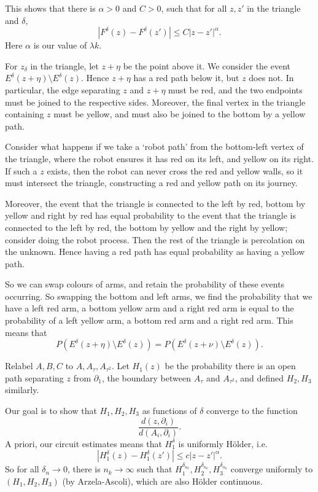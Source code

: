 \documentclass[12pt]{article}
\begin{document}
This shows that there is $\alpha  > 0$ and $C > 0$, such that for all $z, z'$ in the triangle and $\delta$,
\[
|F^{\delta}(z) - F^{\delta}(z')| \leq C |z - z'|^{\alpha}.
\]
Here $\alpha$ is our value of $\lambda k$.

For $z_\delta$ in the triangle, let $z + \eta$ be the point above it. We consider the event $E^{\delta}(z + \eta) \setminus E^{\delta}(z)$. Hence $z + \eta$ has a red path below it, but $z$ does not. In particular, the edge separating $z$ and $z + \eta$ must be red, and the two endpoints must be joined to the respective sides. Moreover, the final vertex in the triangle containing $z$ must be yellow, and must also be joined to the bottom by a yellow path.

Consider what happens if we take a `robot path' from the bottom-left vertex of the triangle, where the robot ensures it has red on its left, and yellow on its right. If such a $z$ exists, then the robot can never cross the red and yellow walls, so it must intersect the triangle, constructing a red and yellow path on its journey.

Moreover, the event that the triangle is connected to the left by red, bottom by yellow and right by red has equal probability to the event that the triangle is connected to the left by red, the bottom by yellow and the right by yellow; consider doing the robot process. Then the rest of the triangle is percolation on the unknown. Hence having a red path has equal probability as having a yellow path.

So we can swap colours of arms, and retain the probability of these events occurring. So swapping the bottom and left arms, we find the probability that we have a left red arm, a bottom yellow arm and a right red arm is equal to the probability of a left yellow arm, a bottom red arm and a right red arm. This means that
\[
P(E^{\delta}(z+\eta) \setminus E^{\delta}(z)) = P(E^{\delta}(z + \nu) \setminus E^{\delta}(z)).
\]


Relabel $A, B, C$ to $A, A_{\tau}, A_{\tau^2}$. Let $H_1(z)$ be the probability there is an open path separating $z$ from $\partial_1$, the boundary between $A_\tau$ and $A_{\tau^2}$, and defined $H_2, H_3$ similarly.

Our goal is to show that $H_1, H_2, H_3$ as functions of $\delta$ converge to the function
\[
\frac{d(z, \partial_i)}{d(A_i, \partial_i)}.
\]
A priori, our circuit estimates means that $H_1^{\delta}$ is uniformly H\"older, i.e.
\[
|H_1^{\delta}(z) - H_1^{\delta}(z')| \leq c|z - z'|^{\alpha}.
\]
So for all $\delta_n \to 0$, there is $n_k \to \infty$ such that $H_1^{\delta_{n_k}}, H_2^{\delta_{n_k}}, H_3^{\delta_{n_k}}$ converge uniformly to $(H_1, H_2, H_3)$ (by Arzela-Ascoli), which are also H\"older continuous.
\end{document}
